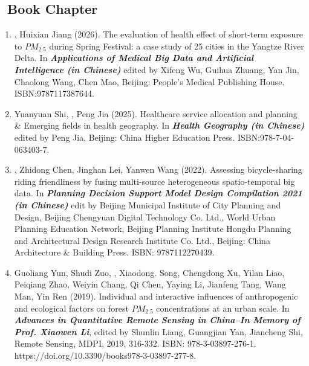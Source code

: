 \subsection*{\texorpdfstring{\faBook\ Book Chapter}{Book Chapter}}
\begin{enumerate}
\item
    \Shaoqing, Huixian Jiang (2026).
    The evaluation of health effect of short-term exposure to $PM_{2.5}$ during Spring Festival: a case study of 25 cities in the Yangtze River Delta. 
    In \textbf{\textit{Applications of Medical Big Data and
Artificial Intelligence (in Chinese)}} edited by Xifeng Wu, Guihua Zhuang, Yan Jin, Chaolong Wang, Chen Mao, Beijing: People's Medical Publishing House. 
    ISBN:9787117387644. 
\item
    Yuanyuan Shi, \Shaoqing, Peng Jia (2025).
    Healthcare service allocation and planning \& Emerging fields in health geography. 
    In \textbf{\textit{Health Geography (in Chinese)}} edited by Peng Jia, Beijing: China Higher Education Press. 
    ISBN:978-7-04-063403-7. 
\item
    \Shaoqing, Zhidong Chen, Jinghan Lei, Yanwen Wang (2022).
    Assessing bicycle-sharing riding friendliness by fusing multi-source heterogeneous spatio-temporal big data.
    In \textbf{\textit{Planning Decision Support Model Design Compilation 2021 (in Chinese)}} 
    edit by Beijing Municipal Institute of City Planning and Design, Beijing Chengyuan Digital Technology Co. Ltd., 
    World Urban Planning Education Network, 
    Beijing Planning Institute Hongdu Planning and Architectural Design Research Institute Co. Ltd., 
    Beijing: China Architecture \& Building Press. ISBN: 9787112270439. 
\item
    Guoliang Yun, Shudi Zuo, \Shaoqing, Xiaodong. Song, Chengdong Xu, Yilan Liao, Peiqiang Zhao, Weiyin Chang, Qi Chen, Yaying Li, Jianfeng Tang, Wang Man, Yin Ren (2019).
	Individual and interactive influences of anthropogenic and ecological factors on forest $PM_{2.5}$ concentrations at an urban scale. 
    In \textbf{\textit{Advances in Quantitative Remote Sensing in China–In Memory of Prof. Xiaowen Li}}, 
    edited by Shunlin Liang, Guangjian Yan, Jiancheng Shi, Remote Sensing, MDPI, 2019, 316-332. ISBN: 978-3-03897-276-1.
    https://doi.org/10.3390/books978-3-03897-277-8. 
\end{enumerate}

